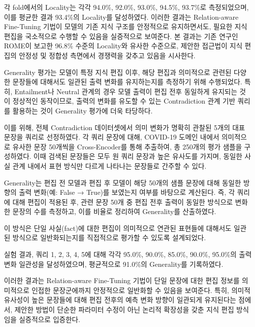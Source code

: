 \documentclass[a4paper,fleqn]{cas-sc}
\begin{document}

각 fold에서의 Locality는 각각 94.0\%, 92.0\%, 93.0\%, 94.5\%, 93.7\%로 측정되었으며, 이를 평균한 결과 93.4\%의 Locality를 달성하였다. 이러한 결과는 Relation-aware Fine-Tuning 기법이 모델의 기존 지식 구조를 안정적으로 유지하면서도, 필요한 지식 편집을 국소적으로 수행할 수 있음을 실증적으로 보여준다. 본 결과는 기존 연구인 ROME이 보고한 96.8\% 수준의 Locality와 유사한 수준으로, 제안한 접근법이 지식 편집의 안정성 및 정합성 측면에서 경쟁력을 갖추고 있음을 시사한다.

Generality 평가는 모델이 특정 지식 편집 이후, 해당 편집과 의미적으로 관련된 다양한 문장들에 대해서도 일관된 출력 변화를 유지하는지를 측정하기 위해 수행되었다. 특히, Entailment나 Neutral 관계의 경우 모델 출력이 편집 전후 동일하게 유지되는 것이 정상적인 동작이므로, 출력의 변화를 유도할 수 있는 Contradiction 관계 기반 쿼리를 활용하는 것이 Generality 평가에 더욱 타당하다.

이를 위해, 전체 Contradiction 데이터셋에서 의미 변화가 명확히 관찰된 5개의 대표 문장을 쿼리로 선정하였다. 각 쿼리 문장에 대해, COVID-19 도메인 내에서 의미적으로 유사한 문장 50개씩을 Cross-Encoder를 통해 추출하여, 총 250개의 평가 샘플을 구성하였다. 이때 검색된 문장들은 모두 원 쿼리 문장과 높은 유사도를 가지며, 동일한 사실 관계 내에서 표현 방식만 다르게 나타나는 문장들로 간주할 수 있다.

Generality는 편집 전 모델과 편집 후 모델이 해당 50개의 샘플 문장에 대해 동일한 방향의 출력 변화(예: False → True)를 보였는지 여부를 바탕으로 계산된다. 즉, 각 쿼리에 대해 편집이 적용된 후, 관련 문장 50개 중 편집 전후 출력이 동일한 방식으로 변화한 문장의 수를 측정하고, 이를 비율로 정리하여 Generality를 산출하였다. 

이 방식은 단일 사실(fact)에 대한 편집이 의미적으로 연관된 표현들에 대해서도 일관된 방식으로 일반화되는지를 직접적으로 평가할 수 있도록 설계되었다.


실험 결과, 쿼리 1, 2, 3, 4, 5에 대해 각각 95.0\%, 90.0\%, 85.0\%, 90.0\%, 95.0\%의 출력 변화 일관성을 달성하였으며, 평균적으로 91.0\%의 Generality를 기록하였다.

이러한 결과는 Relation-aware Fine-Tuning 기법이 단일 문장에 대한 편집 정보를 의미적으로 인접한 문장군에까지 안정적으로 일반화할 수 있음을 보여준다. 특히, 의미적 유사성이 높은 문장들에 대해 편집 전후의 예측 변화 방향이 일관되게 유지된다는 점에서, 제안한 방법이 단순한 파라미터 수정이 아닌 논리적 확장성을 갖춘 지식 편집 방식임을 실증적으로 입증한다.
\end{document}
